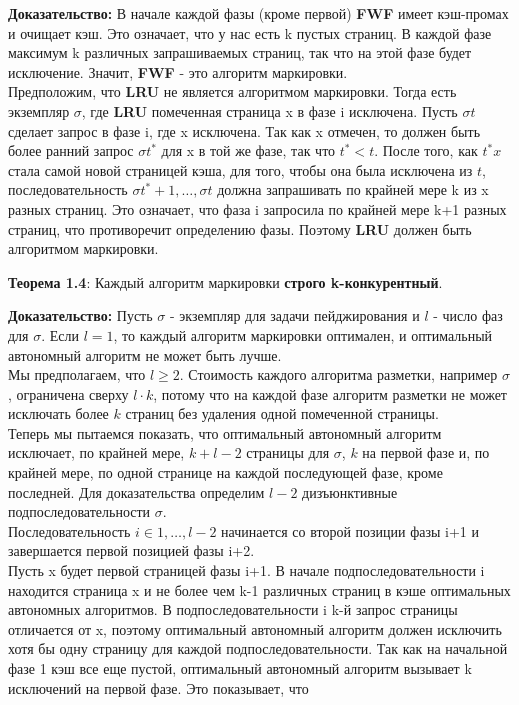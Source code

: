 \textbf{Доказательство:} В начале каждой фазы (кроме первой) \textbf{FWF} имеет кэш-промах и очищает кэш. Это означает, что у нас есть k пустых страниц. В каждой фазе максимум k различных запрашиваемых страниц, так что на этой фазе будет исключение. Значит, \textbf{FWF} - это алгоритм маркировки.\\
Предположим, что \textbf{LRU} не является алгоритмом маркировки. Тогда есть экземпляр $\sigma$, где \textbf{LRU} помеченная страница x в фазе i исключена. Пусть $\sigma t$ сделает запрос в фазе i, где x исключена. Так как x отмечен, то должен быть более ранний запрос $\sigma t^*$ для x в той же фазе, так что $t^*<t$. После того, как $t^* x$ стала самой новой страницей кэша, для того, чтобы она была исключена из $t$, последовательность $\sigma t^*+1,\dots,\sigma t$ должна запрашивать по крайней мере k из x разных страниц. Это означает, что фаза i запросила по крайней мере k+1 разных страниц, что противоречит определению фазы. Поэтому \textbf{LRU} должен быть алгоритмом маркировки.

\vspace{\baselineskip}

\textbf{Теорема 1.4}: Каждый алгоритм маркировки \textbf{строго k-конкурентный}.

\vspace{\baselineskip}

\textbf{Доказательство:} Пусть $\sigma$ - экземпляр для задачи пейджирования и $l$ - число фаз для $\sigma$. Если $l = 1$, то каждый алгоритм маркировки оптимален, и оптимальный автономный алгоритм не может быть лучше. \\
Мы предполагаем, что $l \geq 2$. Стоимость каждого алгоритма разметки, например $\sigma$, ограничена сверху $l \cdot k$, потому что на каждой фазе алгоритм разметки не может исключать более $k$ страниц без удаления одной помеченной страницы. \\
Теперь мы пытаемся показать, что оптимальный автономный алгоритм исключает, по крайней мере, $k+l-2$ страницы для $\sigma$, $k$ на первой фазе и, по крайней мере, по одной странице на каждой последующей фазе, кроме последней. Для доказательства определим $l-2$ дизъюнктивные подпоследовательности $\sigma$. \\
Последовательность $i \in {1,\dots,l-2}$ начинается со второй позиции фазы i+1 и завершается первой позицией фазы i+2. \\
Пусть x будет первой страницей фазы i+1. В начале подпоследовательности i находится страница x и не более чем k-1 различных страниц в кэше оптимальных автономных алгоритмов. В подпоследовательности i k-й запрос страницы отличается от x, поэтому оптимальный автономный алгоритм должен исключить хотя бы одну страницу для каждой подпоследовательности. Так как на начальной фазе 1 кэш все еще пустой, оптимальный автономный алгоритм вызывает k исключений на первой фазе. Это показывает, что

